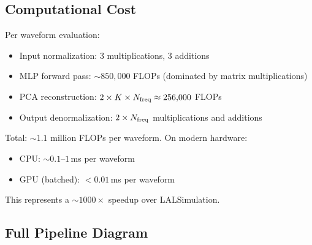 \documentclass[11pt,a4paper]{article}
\begin{document}
\subsection{Computational Cost}

Per waveform evaluation:
\begin{itemize}
    \item Input normalization: 3 multiplications, 3 additions
    \item MLP forward pass: $\sim 850,\!000$ FLOPs (dominated by matrix multiplications)
    \item PCA reconstruction: $2 \times K \times N_{\rm freq} \approx 256,\!000$ FLOPs
    \item Output denormalization: $2 \times N_{\rm freq}$ multiplications and additions
\end{itemize}

Total: $\sim 1.1$ million FLOPs per waveform. On modern hardware:
\begin{itemize}
    \item CPU: $\sim 0.1$--$1\,$ms per waveform
    \item GPU (batched): $< 0.01\,$ms per waveform
\end{itemize}

This represents a $\sim 1000\times$ speedup over LALSimulation.

\subsection{Full Pipeline Diagram}
\end{document}

